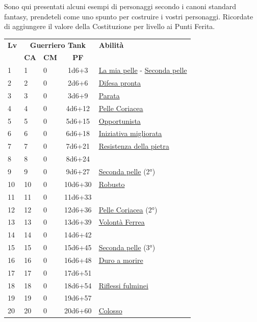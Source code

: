 Sono qui presentati alcuni esempi di personaggi secondo i canoni standard fantasy, prendeteli come uno spunto per costruire i vostri personaggi. Ricordate di aggiungere il valore della Costituzione per livello ai Punti Ferita.

{\small


\begin{multicols}{2}



\noindent\begin{tabularx}{\linewidth}{p{0.3cm}|p{0.3cm}p{0.3cm}c|X|}
	\toprule
 \rowcolor{gray!20}	\textbf{Lv} & \multicolumn{3}{c|}{\textbf{Guerriero Tank}} & \textbf{Abilità} \\
& \centering\arraybackslash \textbf{CA} & \centering\arraybackslash \textbf{CM} & \centering\arraybackslash \textbf{PF} & \\
	\toprule
1 &1	& 0	&	1d6+3	&\hyperlink{La mia pelle}{La mia pelle} - \hyperlink{Seconda pelle}{Seconda pelle}\\
\rowcolor{gray!20}2	&	2	& 0	&	2d6+6	&\hyperlink{Difesa pronta}{Difesa pronta}\\
3	&	3	& 0	&	3d6+9	&\hyperlink{Parata}{Parata}\\
 \rowcolor{gray!20}4	&	4	& 0	&	4d6+12	&\hyperlink{Pelle Coriacea}{Pelle Coriacea}\\
5	&	5	& 0	&	5d6+15	&\hyperlink{Opportunista}{Opportunista}\\
\rowcolor{gray!20}6	&	6	& 0	&	6d6+18	&\hyperlink{Iniziativa migliorata}{Iniziativa migliorata}\\
7	&	7	& 0	&	7d6+21	&\hyperlink{Resistenza della pietra}{Resistenza della pietra}\\
\rowcolor{gray!20}8	&	8	& 0	&	8d6+24	&\\
9	&	9	& 0	&	9d6+27	&\hyperlink{Seconda pelle}{Seconda pelle} (2°)\\
\rowcolor{gray!20}10	&	10	& 0	&	10d6+30	&\hyperlink{Robusto}{Robusto}\\
11	&	11	& 0	&	11d6+33	&\\
\rowcolor{gray!20}12	&	12	& 0	&	12d6+36	&\hyperlink{Pelle Coriacea}{Pelle Coriacea} (2°)\\
13	&	13	& 0	&	13d6+39	&\hyperlink{Volontà Ferrea}{Volontà Ferrea}\\
\rowcolor{gray!20}14	&	14	& 0	&	14d6+42	&\\
15	&	15	& 0	&	15d6+45	&\hyperlink{Seconda pelle}{Seconda pelle} (3°)\\
 \rowcolor{gray!20}16	&	16	& 0	&	16d6+48	&\hyperlink{Duro a morire}{Duro a morire}\\
17	&	17	& 0	&	17d6+51	&\\
 \rowcolor{gray!20}18	&	18	& 0	&	18d6+54	&\hyperlink{Riflessi fulminei}{Riflessi fulminei}\\
	19	&	19	& 0	&	19d6+57	&\\
 \rowcolor{gray!20}20	&	20	& 0	&	20d6+60	&\hyperlink{Colosso}{Colosso}\\
\end{tabularx}


\end{multicols}}

